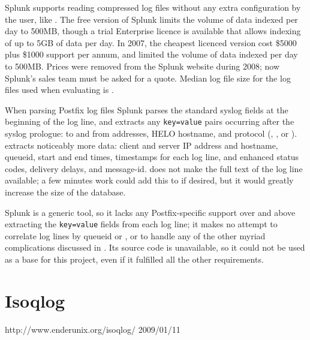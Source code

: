 Splunk supports reading compressed log files without any extra
configuration by the user, like \parsername{}.  The free version of Splunk
limits the volume of data indexed per day to 500MB, though a trial
Enterprise licence is available that allows indexing of up to 5GB of data
per day.  In 2007, the cheapest licenced version cost \$5000 plus \$1000
support per annum, and limited the volume of data indexed per day to
500MB\@.  Prices were removed from the Splunk website during 2008; now
Splunk's sales team must be asked for a quote.  Median log file size for
the \numberOFlogFILES{} log files used when evaluating \parsername{} is
.

When parsing Postfix log files Splunk parses the standard
syslog fields at the beginning of the log line, and extracts
any \texttt{key=value} pairs occurring after the syslog prologue: to and
from addresses, HELO hostname, and protocol (,
, or ).  \parsername{} extracts noticeably
more data: client and server IP address and hostname, queueid, start and
end times, timestamps for each log line,  and enhanced status
codes, delivery delays, and message-id.  \parsername{} does not make the full
text of the log line available; a few minutes work could add this to
\parsername{} if desired, but it would greatly increase the size of the
database.

Splunk is a generic tool, so it lacks any Postfix-specific support over and
above extracting the \texttt{key=value} fields from each log line; it makes
no attempt to correlate log lines by queueid or , or to handle
any of the other myriad complications discussed in
.  Its source code is unavailable, so it could
not be used as a base for this project, even if it fulfilled all the other
requirements.

\section{Isoqlog}

{http://www.enderunix.org/isoqlog/}
{2009/01/11}

